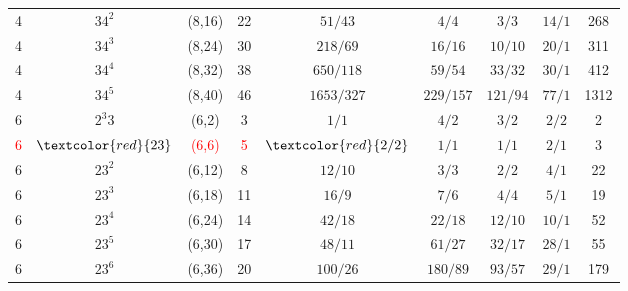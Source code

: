 \documentclass{beamer}
\begin{document}
\begin{frame}
\begin{center}
\begin{tabular}{||c|c|c|c|c|c|c|c|c||}
4 & $34^{2}$ & (8,16) & 22 & $51/43$ & $4/4$ & $3/3$ & $14/1$ & 268\\
4 & $34^{3}$ & (8,24) & 30 & $218/69$ & $16/16$ & $10/10$ & $20/1$ & 311\\
4 & $34^{4}$ & (8,32) & 38 & $650/118$ & $59/54$ & $33/32$ & $30/1$ & 412\\
4 & $34^{5}$ & (8,40) & 46 & $1653/327$ & $229/157$ & $121/94$ & $77/1$ & 1312\\
\hline
6 & $2^{3}3$ & (6,2) & 3 & $1/1$ & $4/2$ & $3/2$ & $2/2$ & 2\\
\textcolor{red}{6} & $\textcolor{red}{23}$ &\textcolor{red}{(6,6)} &\textcolor{red}{ 5} & $\textcolor{red}{2/2}$ & $1/1$ & $1/1$ & $2/1$ & 3\\
6 & $23^{2}$ & (6,12) & 8 & $12/10$ & $3/3$ & $2/2$ & $4/1$ & 22\\
6 & $23^{3}$ & (6,18) & 11 & $16/9$ & $7/6$ & $4/4$ & $5/1$ & 19\\
6 & $23^{4}$ & (6,24) & 14 & $42/18$ & $22/18$ & $12/10$ & $10/1$ & 52\\
6 & $23^{5}$ & (6,30) & 17 & $48/11$ & $61/27$ & $32/17$ & $28/1$ & 55\\
6 & $23^{6}$ & (6,36) & 20 & $100/26$ & $180/89$ & $93/57$ & $29/1$ & 179\\
\hline \hline
\end{tabular}
\end{center}



\end{frame}
\end{document}
